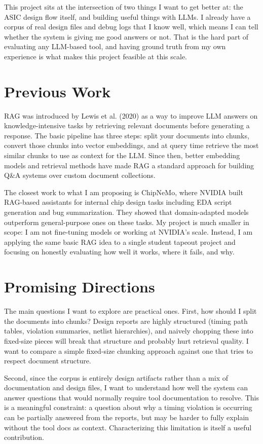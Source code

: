 \documentclass[conference]{IEEEtran}
\begin{document}
This project sits at the intersection of two things I want to get better at: the ASIC design flow itself, and building useful things with LLMs. I already have a corpus of real design files and debug logs that I know well, which means I can tell whether the system is giving me good answers or not. That is the hard part of evaluating any LLM-based tool, and having ground truth from my own experience is what makes this project feasible at this scale.

\section{Previous Work}
RAG was introduced by Lewis et al. (2020) as a way to improve LLM answers on knowledge-intensive tasks by retrieving relevant documents before generating a response\cite{lewis2020rag}. The basic pipeline has three steps: split your documents into chunks, convert those chunks into vector embeddings, and at query time retrieve the most similar chunks to use as context for the LLM. Since then, better embedding models and retrieval methods have made RAG a standard approach for building Q\&A systems over custom document collections.

The closest work to what I am proposing is ChipNeMo\cite{liu2023chipnemo}, where NVIDIA built RAG-based assistants for internal chip design tasks including EDA script generation and bug summarization. They showed that domain-adapted models outperform general-purpose ones on these tasks. My project is much smaller in scope: I am not fine-tuning models or working at NVIDIA's scale. Instead, I am applying the same basic RAG idea to a single student tapeout project and focusing on honestly evaluating how well it works, where it fails, and why.

\section{Promising Directions}
The main questions I want to explore are practical ones. First, how should I split the documents into chunks? Design reports are highly structured (timing path tables, violation summaries, netlist hierarchies), and naively chopping these into fixed-size pieces will break that structure and probably hurt retrieval quality. I want to compare a simple fixed-size chunking approach against one that tries to respect document structure.

Second, since the corpus is entirely design artifacts rather than a mix of documentation and design files, I want to understand how well the system can answer questions that would normally require tool documentation to resolve. This is a meaningful constraint: a question about why a timing violation is occurring can be partially answered from the reports, but may be harder to fully explain without the tool docs as context. Characterizing this limitation is itself a useful contribution.
\end{document}
